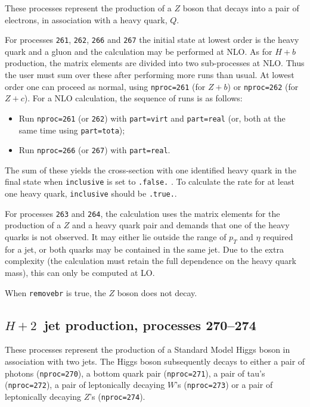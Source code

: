 These processes represent the production of a $Z$
boson that decays into a pair of electrons,
in association with a heavy quark, $Q$.

For processes {\tt 261}, {\tt 262}, {\tt 266} and {\tt 267} the initial
state at lowest order is the heavy quark and a gluon and 
the calculation may be performed at NLO.
As for $H+b$ production, the matrix elements are divided into two
sub-processes at NLO. Thus the user must sum over these after performing
more runs than usual. At lowest order one can proceed as normal, using
{\tt nproc=261} (for $Z+b$) or {\tt nproc=262} (for $Z+c$).
For a NLO calculation, the sequence of runs is as follows:
\begin{itemize}
\item Run {\tt nproc=261} (or {\tt 262}) with {\tt part=virt} and
{\tt part=real} (or, both at the same time using {\tt part=tota});
\item Run {\tt nproc=266} (or {\tt 267}) with {\tt part=real}.
\end{itemize}
The sum of these yields the cross-section with one identified heavy quark in
the final state when {\tt inclusive} is set to {\tt .false.} . To calculate the
rate for at least one heavy quark, {\tt inclusive} should be {\tt .true.}.

For processes {\tt 263} and
{\tt 264}, the calculation uses the matrix elements for the production
of a $Z$ and a heavy quark pair and demands that one of the heavy quarks
is not observed. It may either lie outside the range of $p_T$ and $\eta$
required for a jet, or both quarks may be contained in the same jet.
Due to the extra complexity (the calculation must retain the full
dependence on the heavy quark mass), this can only be computed at LO.

When {\tt removebr} is true, the $Z$ boson does not decay.

\subsection{$H + 2$~jet production, processes 270--274}

These processes represent the production of a Standard Model Higgs boson
in association with two jets. The Higgs boson
subsequently decays to either a pair of photons ({\tt nproc=270}), a bottom quark pair ({\tt nproc=271}), 
a pair of tau's ({\tt nproc=272}), a pair of leptonically decaying $W$'s ({\tt nproc=273}) 
or a pair of leptonically decaying $Z$'s ({\tt nproc=274}).

